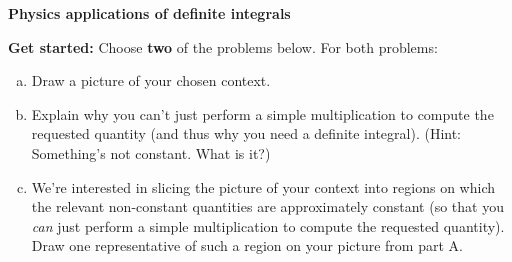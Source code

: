 \documentclass[12pt]{article}
\renewcommand{\section}[1]{\begin{center} \textbf{#1} \\\end{center}}
\begin{document}
%


\allowdisplaybreaks
\section{Physics applications of definite integrals}
\textbf{Get started:} Choose \textbf{two} of the problems below. For both problems: 
\begin{enumerate}[(a)]
\item Draw a picture of your chosen context. 
\item Explain why you can't just perform a simple multiplication to compute the requested quantity (and thus why you need a definite integral). (Hint: Something's not constant. What is it?)
\item We're interested in slicing the picture of your context into regions on which the relevant non-constant quantities are approximately constant (so that you \textit{can} just perform a simple multiplication to compute the requested quantity). Draw one representative of such a region on your picture from part A.
\end{enumerate}
\end{document}
